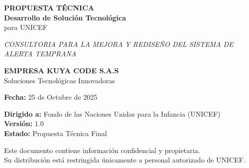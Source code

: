 \begin{titlepage}
    \centering
    
    
    \vspace{2cm}
    
    {\Huge\bfseries PROPUESTA TÉCNICA\\[0.5cm]}
    {\Large\bfseries Desarrollo de Solución Tecnológica\\[0.3cm]}
    {\Large para UNICEF\\[2cm]}
    
    {\large\textit{CONSULTORIA PARA LA MEJORA Y REDISEÑO DEL SISTEMA DE ALERTA TEMPRANA}\\[3cm]}
    
    {\Large\bfseries EMPRESA KUYA CODE S.A.S\\[0.5cm]}
    {\large Soluciones Tecnológicas Innovadoras\\[2cm]}
    
    {\large\textbf{Fecha:} 25 de Octubre de 2025\\[1cm]}
    
    {\normalsize
    \textbf{Dirigido a:} Fondo de las Naciones Unidas para la Infancia (UNICEF)\\[0.3cm]
    \textbf{Versión:} 1.0\\[0.3cm]
    \textbf{Estado:} Propuesta Técnica Final\\
    }
    
    \vfill
    
    {\footnotesize
    Este documento contiene información confidencial y propietaria.\\
    Su distribución está restringida únicamente a personal autorizado de UNICEF.
    }
    
\end{titlepage}

\newpage
\thispagestyle{empty}
\mbox{}
\newpage